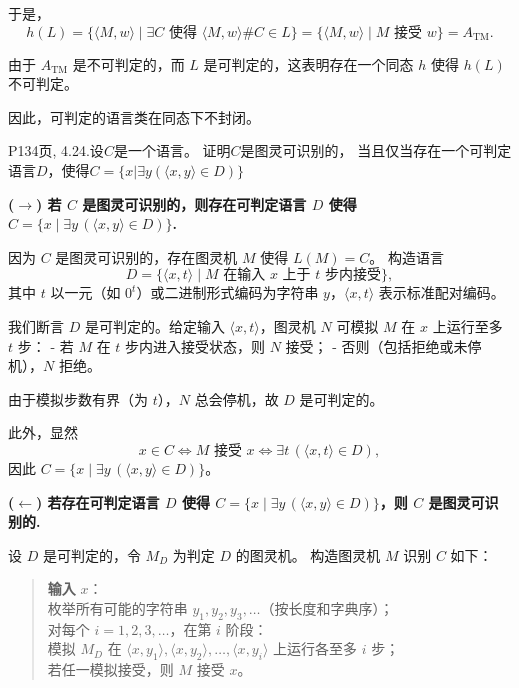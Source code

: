 \documentclass[11pt,addpoints,answers]{exam}
\begin{document}
\begin{questions}
\begin{solution}
        于是，
        \[
        h(L) = \{ \langle M, w \rangle \mid \exists C \text{ 使得 } \langle M, w \rangle \# C \in L \}
              = \{ \langle M, w \rangle \mid M \text{ 接受 } w \}
              = A_{\text{TM}}.
        \]
        
        由于 $A_{\text{TM}}$ 是不可判定的，而 $L$ 是可判定的，这表明存在一个同态 $h$ 使得 $h(L)$ 不可判定。
        
        因此，可判定的语言类在同态下不封闭。
	\end{solution}
	
	
	
	
	\question P134页, 4.24.设$C$是一个语言。 证明$C$是图灵可识别的， 当且仅当存在一个可判定语言$D$，使得$C=\{x|\exists y(\langle x,y\rangle\in D)\}$
	\begin{solution}
    
        \noindent\textbf{($\rightarrow$) 若 $C$ 是图灵可识别的，则存在可判定语言 $D$ 使得 $C = \{x \mid \exists y\, (\langle x,y\rangle \in D)\}$.}
        
        因为 $C$ 是图灵可识别的，存在图灵机 $M$ 使得 $L(M) = C$。  
        构造语言
        \[
        D = \{ \langle x, t \rangle \mid M \text{ 在输入 } x \text{ 上于 } t \text{ 步内接受} \},
        \]
        其中 $t$ 以一元（如 $0^t$）或二进制形式编码为字符串 $y$，$\langle x, t \rangle$ 表示标准配对编码。
        
        我们断言 $D$ 是可判定的。给定输入 $\langle x, t \rangle$，图灵机 $N$ 可模拟 $M$ 在 $x$ 上运行至多 $t$ 步：
        - 若 $M$ 在 $t$ 步内进入接受状态，则 $N$ 接受；
        - 否则（包括拒绝或未停机），$N$ 拒绝。
        
        由于模拟步数有界（为 $t$），$N$ 总会停机，故 $D$ 是可判定的。
        
        此外，显然
        \[
        x \in C \iff M \text{ 接受 } x \iff \exists t\, (\langle x, t \rangle \in D),
        \]
        因此 $C = \{ x \mid \exists y\, (\langle x, y \rangle \in D) \}$。
        
        \noindent\textbf{($\leftarrow$) 若存在可判定语言 $D$ 使得 $C = \{x \mid \exists y\, (\langle x,y\rangle \in D)\}$，则 $C$ 是图灵可识别的.}
        
        设 $D$ 是可判定的，令 $M_D$ 为判定 $D$ 的图灵机。  
        构造图灵机 $M$ 识别 $C$ 如下：
        
        \begin{quote}
        \textbf{输入} $x$：\\
        枚举所有可能的字符串 $y_1, y_2, y_3, \dots$（按长度和字典序）；\\
        对每个 $i = 1, 2, 3, \dots$，在第 $i$ 阶段：\\
        \quad 模拟 $M_D$ 在 $\langle x, y_1 \rangle, \langle x, y_2 \rangle, \dots, \langle x, y_i \rangle$ 上运行各至多 $i$ 步；\\
        \quad 若任一模拟接受，则 $M$ 接受 $x$。
        \end{quote}
        

\end{solution}
\end{questions}
\end{document}
